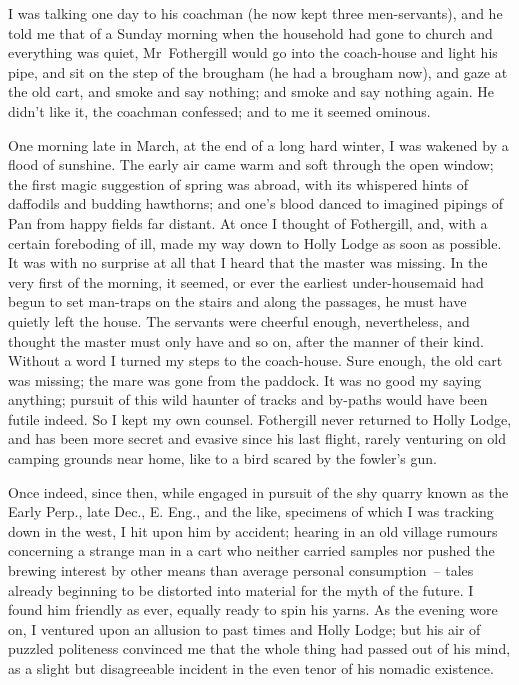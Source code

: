 I was talking one day to his coachman (he now kept three
men-servants), and he told me that of a Sunday morning when the
household had gone to church and everything was quiet, Mr~Fothergill
would go into the coach-house and light his pipe, and sit on the step
of the brougham (he had a brougham now), and gaze at the old cart, and
smoke and say nothing; and smoke and say nothing again. He didn't like
it, the coachman confessed; and to me it seemed ominous.

One morning late in March, at the end of a long hard winter, I was
wakened by a flood of sunshine. The early air came warm and soft
through the open window; the first magic suggestion of spring was
abroad, with its whispered hints of daffodils and budding hawthorns;
and one's blood danced to imagined pipings of Pan from happy fields
far distant. At once I thought of Fothergill, and, with a certain
foreboding of ill, made my way down to Holly Lodge as soon as
possible. It was with no surprise at all that I heard that the master
was missing. In the very first of the morning, it seemed, or ever the
earliest under-housemaid had begun to set man-traps on the stairs and
along the passages, he must have quietly left the house. The servants
were cheerful enough, nevertheless, and thought the master must only
have  and so on, after the manner of
their kind. Without a word I turned my steps to the coach-house. Sure
enough, the old cart was missing; the mare was gone from the
paddock. It was no good my saying anything; pursuit of this wild
haunter of tracks and by-paths would have been futile indeed. So I
kept my own counsel. Fothergill never returned to Holly Lodge, and has
been more secret and evasive since his last flight, rarely venturing
on old camping grounds near home, like to a bird scared by the
fowler's gun.

Once indeed, since then, while engaged in pursuit of the shy quarry
known as the Early Perp., late Dec., E. Eng., and the like, specimens
of which I was tracking down in the west, I hit upon him by accident;
hearing in an old village rumours concerning a strange man in a cart
who neither carried samples nor pushed the brewing interest by other
means than average personal consumption~-- tales already beginning to
be distorted into material for the myth of the future. I found him
friendly as ever, equally ready to spin his yarns. As the evening wore
on, I ventured upon an allusion to past times and Holly Lodge; but his
air of puzzled politeness convinced me that the whole thing had passed
out of his mind, as a slight but disagreeable incident in the even
tenor of his nomadic existence.

